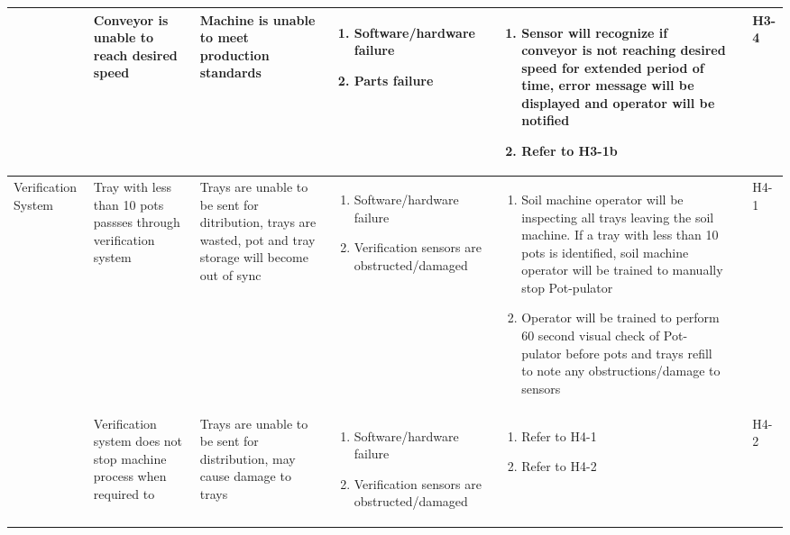 \documentclass{article}
\begin{document}
\begin{landscape}
\begin{center}
\begin{longtable}{|l|  p{3cm}  p{4cm}  p{4cm}  p{4cm}  p{1cm}  p{1cm}|}
        &
        Conveyor is unable to reach desired speed&
        Machine is unable to meet production standards&
        \begin{enumerate}[label=(\alph*)]
            \item Software/hardware failure
            \item Parts failure
        \end{enumerate}&
        \begin{enumerate}[label=(\alph*)]
            \item  Sensor will recognize if conveyor is not reaching desired speed for extended period of time, error message will be displayed and operator will be notified
            \item Refer to H3-1b
        \end{enumerate}&
        &
        H3-4\\

        \hline

        Verification System&
        Tray with less than 10 pots passses through verification system&
        Trays are unable to be sent for ditribution, trays are wasted, pot and tray storage will become out of sync&
        \begin{enumerate}[label=(\alph*)]
            \item Software/hardware failure
            \item Verification sensors are obstructed/damaged
        \end{enumerate}&
        \begin{enumerate}[label=(\alph*)]
            \item Soil machine operator will be inspecting all trays leaving the soil machine. If a tray with less than 10 pots is identified, soil machine operator will be trained to manually stop Pot-pulator
            \item Operator will be trained to perform 60 second visual check of Pot-pulator before pots and trays refill to note any obstructions/damage to sensors
        \end{enumerate}&
        &
        H4-1\\

        &
        Verification system does not stop machine process when required to&
        Trays are unable to be sent for distribution, may cause damage to trays&
        \begin{enumerate}[label=(\alph*)]
            \item Software/hardware failure
            \item Verification sensors are obstructed/damaged
        \end{enumerate}&
        \begin{enumerate}[label=(\alph*)]
            \item Refer to H4-1
            \item Refer to H4-2
        \end{enumerate}&
        &
        H4-2\\


\end{longtable}
\end{center}
\end{landscape}
\end{document}
